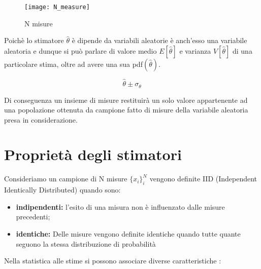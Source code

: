 \begin{figure}[ht]
\vspace{0.6in}
\texttt{[image: N\_measure]}	
\centering
\vspace{0.3in}
\caption{N misure}
\end{figure}

\noindent Poich\`{e} lo stimatore $\hat{\theta}$ \`{e} dipende da variabili aleatorie \`{e} anch'esso  una variabile aleatoria e dunque si pu\`{o} parlare di valore medio $E[\hat{\theta}]$ e varianza $V[\hat{\theta}]$ di una particolare stima, oltre ad avere una sua pdf$(\hat{\theta})$.

\begin{equation}
	\hat{\theta} \pm \sigma_{\theta}
\end{equation} 

Di conseguenza un insieme di misure restituir\`{a} un solo valore appartenente ad una popolazione ottenuta da campione fatto di misure della variabile aleatoria presa in considerazione.

\section{Propriet\`{a} degli stimatori}

Consideriamo un campione di N misure $\{x_i\}_i^N$ vengono definite IID (Independent Identically Distributed) quando sono:
\begin{itemize}
	\item \textbf{indipendenti:} l'esito di una misura non \`{e} influenzato dalle misure precedenti;
	\item \textbf{identiche:} Delle misure vengono definite identiche quando tutte quante seguono la stessa distribuzione di probabilit\`{a}
\end{itemize}
Nella statistica alle stime si possono associare diverse caratteristiche :

